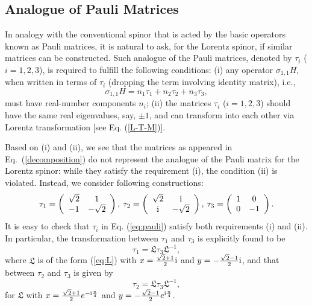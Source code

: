 \documentclass[pra,epsfig,rotate,superscriptaddress,showpacs]{revtex4}
\begin{document}
\subsection{Analogue of Pauli Matrices}
In analogy with the conventional spinor that is acted by the basic operators known as Pauli matrices, it is natural to ask, for the Lorentz spinor, if similar matrices can be constructed. Such analogue of the Pauli matrices, denoted by $\tau_i$ ($i=1,2,3$), is required to fulfill the following conditions: (i) any operator $\sigma_{1,1} H$, when written in terms of $\tau_i$ (dropping the term involving identity matrix), i.e.,
\begin{equation} \label{se-decomposition}
\sigma_{1,1} H=n_1\tau_1+n_2\tau_2+n_3\tau_3,
\end{equation}
must have real-number components $n_i$; (ii) the matrices $\tau_i$ ($i=1,2,3$) should have the same real eigenvalues, say, $\pm1$, and can transform into each other via Lorentz transformation [see Eq. (\ref{L-T-M})].

Based on (i) and (ii), we see that the matrices as appeared in Eq.~(\ref{decomposition}) do not represent the analogue of the Pauli matrix for the Lorentz spinor: while they
satisfy the requirement (i), the condition (ii) is violated. Instead, we consider following constructions:
\begin{equation}\label{eq:pauli}
\tau_1=\left(\begin{array}{cc}\sqrt{2}&1 \\ -1&-\sqrt{2}\end{array} \right), \medspace \tau_2=\left(\begin{array}{cc}\sqrt{2}&{\text i} \\ {\text i}&-\sqrt{2}\end{array} \right), \medspace \tau_3=\left(\begin{array}{cc}1&0 \\ 0&-1\end{array} \right).
\end{equation}
It is easy to check that $\tau_i$ in Eq. (\ref{eq:pauli}) satisfy both requirements (i) and (ii). In particular, the transformation between $\tau_1$ and $\tau_3$ is explicitly found to be
\begin{equation}
\tau_1=\mathfrak{L}\tau_3\mathfrak{L}^{-1},
\end{equation}
where $\mathfrak{L}$ is of the form (\ref{eq:L}) with $x=\frac{\sqrt{2}+1}{2}{\text i}$ and $y=-\frac{\sqrt{2}-1}{2}{\text i}$, and that between $\tau_2$ and $\tau_3$ is given by
\begin{equation}
\tau_2=\mathfrak{L}\tau_3\mathfrak{L}^{-1},
\end{equation}
for  $\mathfrak{L}$ with $x=\frac{\sqrt{2}+1}{2}e^{-{\text i}\frac{\pi}{4}}$ and $y=-\frac{\sqrt{2}-1}{2}e^{{\text i}\frac{\pi}{4}}$.
\end{document}
